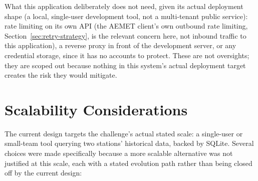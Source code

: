 \documentclass[11pt,a4paper]{article}
\begin{document}
What this application deliberately does not need, given its actual
deployment shape (a local, single-user development tool, not a
multi-tenant public service): rate limiting on its own API (the AEMET
client's own outbound rate limiting, Section~\ref{sec:retry-strategy}, is
the relevant concern here, not inbound traffic to this application),
a reverse proxy in front of the development server, or any credential
storage, since it has no accounts to protect. These are not oversights;
they are scoped out because nothing in this system's actual deployment
target creates the risk they would mitigate.

\section{Scalability Considerations}
\label{sec:scalability}

The current design targets the challenge's actual stated scale: a
single-user or small-team tool querying two stations' historical data,
backed by SQLite. Several choices were made specifically because a more
scalable alternative was not justified at this scale, each with a stated
evolution path rather than being closed off by the current design:
\end{document}
